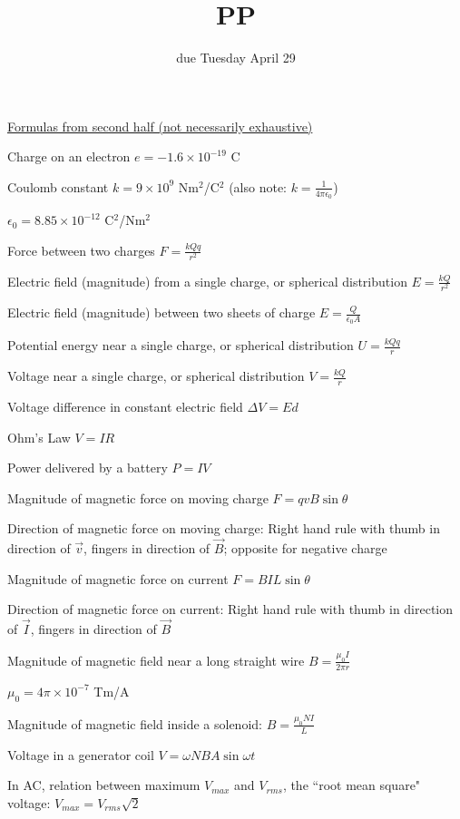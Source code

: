 \documentclass[12pt]{article}
\title{PP}
\date{due Tuesday April 29}
\begin{document}
\setlength{\parindent}{0pt}
\setlength{\parskip}{3mm}

\underline{Formulas from second half (not necessarily exhaustive)}


Charge on an electron $e=-1.6\times 10^{-19}$ C

Coulomb constant $k=9\times 10^9$ Nm$^2$/C$^2$ (also note: $k=\frac{1}{4\pi\epsilon_{0}}$)

$\epsilon_0=8.85 \times 10^{-12}$ C$^2$/Nm$^2$

Force between two charges $F=\frac{kQq}{r^2}$

Electric field (magnitude) from a single charge, or spherical distribution $E=\frac{kQ}{r^2}$

Electric field (magnitude) between two sheets of charge $E=\frac{Q}{\epsilon_0 A}$

Potential energy near a single charge, or spherical distribution $U=\frac{kQq}{r}$

Voltage near a single charge, or spherical distribution $V=\frac{kQ}{r}$ 

Voltage difference in constant electric field $\Delta V=Ed$

Ohm's Law $V=IR$

Power delivered by a battery $P=IV$

Magnitude of magnetic force on moving charge $F=qvB\sin \theta$

Direction of magnetic force on moving charge: Right hand rule with thumb in direction of $\vec{v}$, fingers in direction of $\vec{B}$; opposite for negative charge

Magnitude of magnetic force on current $F=BIL \sin \theta$

Direction of magnetic force on current: Right hand rule with thumb in direction of $\vec{I}$, fingers in direction of $\vec{B}$

Magnitude of magnetic field near a long straight wire $B=\frac{\mu_0 I}{2\pi r}$

$\mu_0=4\pi\times10^{-7}$ Tm/A

Magnitude of magnetic field inside a solenoid: $B=\frac{\mu_0 N I}{L}$

Voltage in a generator coil $V=\omega NBA \sin \omega t$

In AC, relation between maximum $V_{max}$ and $V_{rms}$, the ``root mean square" voltage: $V_{max}=V_{rms}\sqrt{2}$
\end{document}
